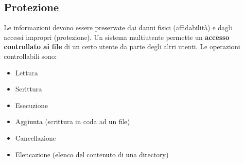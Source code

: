\documentclass[12pt]{article}
\begin{document}
\subsection{Protezione}
Le informazioni devono essere preservate dai danni fisici (affidabilità) e dagli accessi impropri (protezione).
Un sistema multiutente permette un \textbf{accesso controllato ai file} di un certo utente da parte degli altri utenti.
Le operazioni controllabili sono:
\begin{itemize}
    \item Lettura
    \item Scrittura
    \item Esecuzione
    \item Aggiunta (scrittura in coda ad un file)
    \item Cancellazione
    \item Elencazione (elenco del contenuto di una directory)
\end{itemize}
\end{document}
